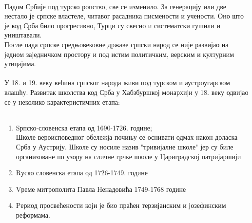 \documentclass[12pt,twoside]{article}
\begin{document}
  \\ Падом Србије под турско ропство, све се изменило. За генерацију или две нестало је српске властеле, читавог расадника писмености и учености. Оно што је код Срба било прогресивно, Турци су свесно и систематски гушили и уништавали. \\После пада српске средњовековне државе српски народ се није развијао на једном заједничком простору и под истим политичким, верским и културним утицајима.\\
  \\У 18. и 19. веку већина српског народа живи под турском и аустроугарском влашћу. Развитак школства код Срба у Хабзбуршкој монархији у 18. веку одвијао се у неколико карактеристичних етапа:\\\\
  \begin{enumerate}
      \item Sрпско-словенска етапа од 1690-1726. године;\\ Школе вероисповедног обележја почињу се оснивати одмах након доласка Срба у Аустрију. Школе су носиле назив "тривијалне школе" јер су биле организоване по узору на сличне грчке школе у Цариградској патријаршији
      \item Rуско словенска етапа од 1726-1749. године
      \item Vреме митрополита Павла Ненадовића 1749-1768 године
      \item Pериод просвећености који је био праћен терзијанским и јозефинским реформама.
  \end{enumerate}
  \\\\
\end{document}
